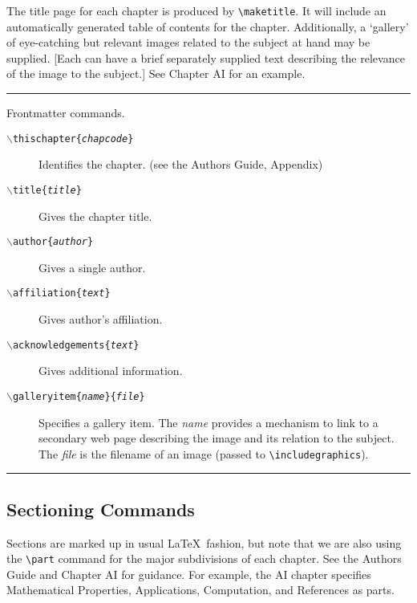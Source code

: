 \documentclass[twoside]{article}
\newcommand{\BS}{$\backslash$}
\newenvironment{Table}[1]{%
   \begin{table}[htb]\hrule\begin{centering}\caption{#1}}{%
   \par\end{centering}\hrule\end{table}}
\newenvironment{Description}{%
   \begingroup\def\arraystretch{1.3}\small\begin{description}}{%
   \end{description}\endgroup}
\begin{document}
The title page for each chapter is produced by \verb|\maketitle|.
It will include an automatically generated table of contents for the chapter.
Additionally, a `gallery' of eye-catching but relevant images related
to the subject at hand may be supplied.  [Each can have a brief separately
supplied text describing the relevance of the image to the subject.]
See Chapter AI for an example.

\begin{Table}{Frontmatter commands.\label{tab:frontmatter}}
\begin{Description}
\item[\texttt{\BS thischapter\{\textit{chapcode}\}}] Identifies the chapter.
   (see the Authors Guide, Appendix)
\item[\texttt{\BS title\{\textit{title}\}}] Gives the chapter title.
\item[\texttt{\BS author\{\textit{author}\}}] Gives a single author.
\item[\texttt{\BS affiliation\{\textit{text}\}}] 
   Gives author's  affiliation.
\item[\texttt{\BS acknowledgements\{\textit{text}\}}] Gives additional information.
\item[\texttt{\BS galleryitem\{\textit{name}\}\{\textit{file}\}}]
  Specifies a gallery item.  The \textit{name} provides a mechanism
to link to a secondary web page describing the image and its relation
to the subject.  The \textit{file} is the filename of an image
(passed to \verb|\includegraphics|).
\end{Description}
\end{Table}

\subsection{Sectioning Commands}\label{sec:sectioning}
Sections are marked up in usual \LaTeX\ fashion,
but note that we are also using the \verb|\part| command for the major
subdivisions of each chapter.
See the Authors Guide and Chapter AI for guidance.  For example, the AI chapter
specifies Mathematical Properties, Applications, Computation, and References
as parts.
\end{document}
